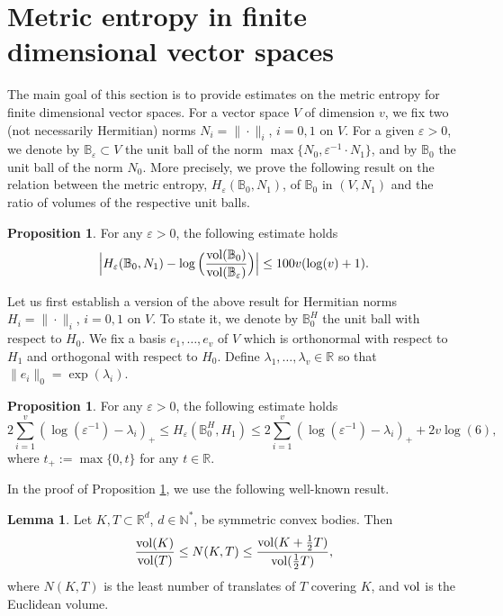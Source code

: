 \documentclass[12pt]{article}
\numberwithin{equation}{section}
\theoremstyle{theorem}
\theoremstyle{definition}
\newtheorem{prop}[thm]{Proposition}
\newtheorem{lem}[thm]{Lemma}
\theoremstyle{remark}
\newcommand{\real}{\mathbb{R}}
\newcommand{\nat}{\mathbb{N}}
\begin{document}
	\section{Metric entropy in finite dimensional vector spaces}\label{sect_met_fd}
	The main goal of this section is to provide estimates on the metric entropy for finite dimensional vector spaces.
	For a vector space $V$ of dimension $v$, we fix two (not necessarily Hermitian) norms $N_i = \| \cdot \|_i$, $i = 0, 1$ on $V$.
	For a given $\varepsilon > 0$, we denote by $\mathbb{B}_{\varepsilon} \subset V$ the unit ball of the norm $\max \{ N_0, \varepsilon^{-1} \cdot N_1 \}$, and by $\mathbb{B}_{0}$ the unit ball of the norm $N_0$.
	More precisely, we prove the following result on the relation between the metric entropy, $H_{\varepsilon}(\mathbb{B}_0, N_1)$, of $\mathbb{B}_0$ in $(V, N_1)$ and the ratio of volumes of the respective unit balls.
	\begin{prop}\label{prop_entr_balls}
		For any $\varepsilon > 0$, the following estimate holds
		\begin{equation}
			\Big|
			H_{\varepsilon}(\mathbb{B}_0, N_1)
			-
			\log \Big( \frac{{\rm{vol}}(\mathbb{B}_{0})}{{\rm{vol}}(\mathbb{B}_{\varepsilon})} \Big)
			\Big|
			\leq
			100 v (\log(v) + 1).
		\end{equation}
	\end{prop}
	\par 
	Let us first establish a version of the above result for Hermitian norms $H_i = \| \cdot \|_i$, $i = 0, 1$ on $V$.
	To state it, we denote by $\mathbb{B}^H_0$ the unit ball with respect to $H_0$.
	We fix a basis $e_1, \ldots, e_v$ of $V$ which is orthonormal with respect to $H_1$ and orthogonal with respect to $H_0$.
	Define $\lambda_1, \ldots, \lambda_v \in \real$ so that $\| e_i \|_0 = \exp(\lambda_i)$.
	\begin{prop}\label{prop_entr}
		For any $\varepsilon > 0$, the following estimate holds
		\begin{equation}
			2 \sum_{i = 1}^v
			(\log (\varepsilon^{-1}) - \lambda_i)_+
			\leq
			H_{\varepsilon}(\mathbb{B}^H_0, H_1)
			\leq
			2 \sum_{i = 1}^v
			(\log (\varepsilon^{-1}) - \lambda_i)_+
			+
			2v \log(6),
		\end{equation}
		where $t_+ := \max\{0, t \}$ for any $t \in \real$.
	\end{prop}
	In the proof of Proposition \ref{prop_entr}, we use the following well-known result.
	\begin{lem}\label{lem_cov}
		Let $K, T \subset \real^d$, $d \in \nat^*$, be symmetric convex bodies. Then
		\begin{equation}\label{eq_lem_cov}
			\frac{{\rm{vol}}(K)}{{\rm{vol}}(T)} \leq N(K,T) \leq
	 		\frac{{\rm{vol}}(K + \frac{1}{2} T)}{{\rm{vol}}( \frac{1}{2} T )},
		\end{equation}
		where $N(K, T)$ is the least number of translates of $T$ covering $K$, and ${\rm{vol}}$ is the Euclidean volume.
	\end{lem}
\end{document}
